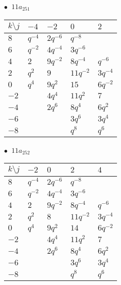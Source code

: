 \begin{minipage}{\linewidth}
$\bullet\ $ $11a_{251}$ \vspace{0.5em} \\
\begin{tabular}{l|llll}
$k \setminus j$ & $-4$ & $-2$ & $0$ & $2$ \\
\hline
$8$ & $q^{-4}$ & $2q^{-6}$ & $q^{-8}$ &  \\
$6$ & $q^{-2}$ & $4q^{-4}$ & $3q^{-6}$ &  \\
$4$ & $2$ & $9q^{-2}$ & $8q^{-4}$ & $q^{-6}$ \\
$2$ & $q^{2}$ & $9$ & $11q^{-2}$ & $3q^{-4}$ \\
$0$ & $q^{4}$ & $9q^{2}$ & $15$ & $6q^{-2}$ \\
$-2$ &  & $4q^{4}$ & $11q^{2}$ & $7$ \\
$-4$ &  & $2q^{6}$ & $8q^{4}$ & $6q^{2}$ \\
$-6$ &  &  & $3q^{6}$ & $3q^{4}$ \\
$-8$ &  &  & $q^{8}$ & $q^{6}$ \\
\end{tabular}
\vspace{2em}
\end{minipage}
%
\begin{minipage}{\linewidth}
$\bullet\ $ $11a_{252}$ \vspace{0.5em} \\
\begin{tabular}{l|llll}
$k \setminus j$ & $-2$ & $0$ & $2$ & $4$ \\
\hline
$8$ & $q^{-4}$ & $2q^{-6}$ & $q^{-8}$ &  \\
$6$ & $q^{-2}$ & $4q^{-4}$ & $3q^{-6}$ &  \\
$4$ & $2$ & $9q^{-2}$ & $8q^{-4}$ & $q^{-6}$ \\
$2$ & $q^{2}$ & $8$ & $11q^{-2}$ & $3q^{-4}$ \\
$0$ & $q^{4}$ & $9q^{2}$ & $14$ & $6q^{-2}$ \\
$-2$ &  & $4q^{4}$ & $11q^{2}$ & $7$ \\
$-4$ &  & $2q^{6}$ & $8q^{4}$ & $6q^{2}$ \\
$-6$ &  &  & $3q^{6}$ & $3q^{4}$ \\
$-8$ &  &  & $q^{8}$ & $q^{6}$ \\
\end{tabular}
\vspace{2em}
\end{minipage}
%
